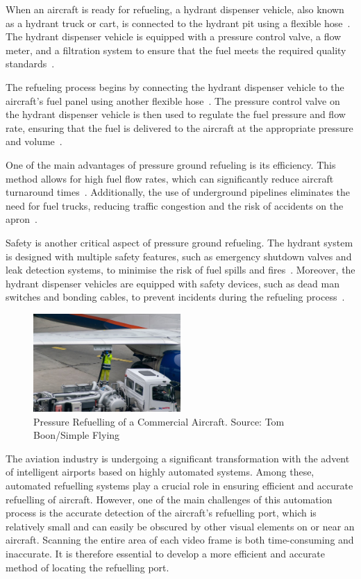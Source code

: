 \documentclass[12pt,oneside]{book} %
\begin{document}
When an aircraft is ready for refueling, a hydrant dispenser vehicle, also
known as a hydrant truck or cart, is connected to the hydrant pit using a
flexible hose~\cite{sati2019aircraft}. The hydrant dispenser vehicle is
equipped with a pressure control valve, a flow meter, and a filtration system
to ensure that the fuel meets the required quality
standards~\cite{iata2019guidance}.

The refueling process begins by connecting the hydrant dispenser vehicle to the
aircraft's fuel panel using another flexible hose~\cite{sati2019aircraft}. The
pressure control valve on the hydrant dispenser vehicle is then used to
regulate the fuel pressure and flow rate, ensuring that the fuel is delivered
to the aircraft at the appropriate pressure and volume~\cite{iata2019guidance}.

One of the main advantages of pressure ground refueling is its efficiency. This
method allows for high fuel flow rates, which can significantly reduce aircraft
turnaround times~\cite{blakey2011aviation}. Additionally, the use of
underground pipelines eliminates the need for fuel trucks, reducing traffic
congestion and the risk of accidents on the apron~\cite{kazda2015airport}.

Safety is another critical aspect of pressure ground refueling. The hydrant
system is designed with multiple safety features, such as emergency shutdown
valves and leak detection systems, to minimise the risk of fuel spills and
fires~\cite{iata2019guidance}. Moreover, the hydrant dispenser vehicles are
equipped with safety devices, such as dead man switches and bonding cables, to
prevent incidents during the refueling process~\cite{sati2019aircraft}.

\begin{figure}[H]
    \centering
    \includegraphics[width=0.5\textwidth]{figures/pressure-refuelling.jpeg}
    \caption{Pressure Refuelling of a Commercial Aircraft. Source: Tom Boon/Simple Flying}\label{fig:pressure-refuelling}
\end{figure}

The aviation industry is undergoing a significant transformation with the
advent of intelligent airports based on highly automated systems. Among these,
automated refuelling systems play a crucial role in ensuring efficient and
accurate refuelling of aircraft. However, one of the main challenges of this
automation process is the accurate detection of the aircraft's refuelling port,
which is relatively small and can easily be obscured by other visual elements
on or near an aircraft. Scanning the entire area of each video frame is both
time-consuming and inaccurate. It is therefore essential to develop a more
efficient and accurate method of locating the refuelling port.
\end{document}
